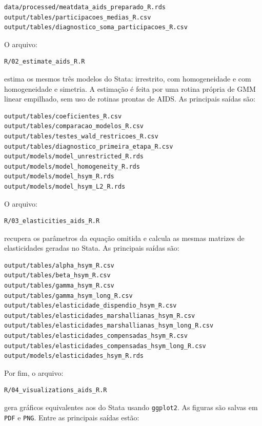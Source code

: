 \documentclass[12pt,a4paper]{article}
\begin{document}
\begin{verbatim}
data/processed/meatdata_aids_preparado_R.rds
output/tables/participacoes_medias_R.csv
output/tables/diagnostico_soma_participacoes_R.csv
\end{verbatim}

O arquivo:

\begin{verbatim}
R/02_estimate_aids_R.R
\end{verbatim}

estima os mesmos três modelos do Stata: irrestrito, com homogeneidade e com homogeneidade e simetria. A estimação é feita por uma rotina própria de GMM linear empilhado, sem uso de rotinas prontas de AIDS. As principais saídas são:

\begin{verbatim}
output/tables/coeficientes_R.csv
output/tables/comparacao_modelos_R.csv
output/tables/testes_wald_restricoes_R.csv
output/tables/diagnostico_primeira_etapa_R.csv
output/models/model_unrestricted_R.rds
output/models/model_homogeneity_R.rds
output/models/model_hsym_R.rds
output/models/model_hsym_L2_R.rds
\end{verbatim}

O arquivo:

\begin{verbatim}
R/03_elasticities_aids_R.R
\end{verbatim}

recupera os parâmetros da equação omitida e calcula as mesmas matrizes de elasticidades geradas no Stata. As principais saídas são:

\begin{verbatim}
output/tables/alpha_hsym_R.csv
output/tables/beta_hsym_R.csv
output/tables/gamma_hsym_R.csv
output/tables/gamma_hsym_long_R.csv
output/tables/elasticidade_dispendio_hsym_R.csv
output/tables/elasticidades_marshallianas_hsym_R.csv
output/tables/elasticidades_marshallianas_hsym_long_R.csv
output/tables/elasticidades_compensadas_hsym_R.csv
output/tables/elasticidades_compensadas_hsym_long_R.csv
output/models/elasticidades_hsym_R.rds
\end{verbatim}

Por fim, o arquivo:

\begin{verbatim}
R/04_visualizations_aids_R.R
\end{verbatim}

gera gráficos equivalentes aos do Stata usando \texttt{ggplot2}. As figuras são salvas em \texttt{PDF} e \texttt{PNG}. Entre as principais saídas estão:
\end{document}
